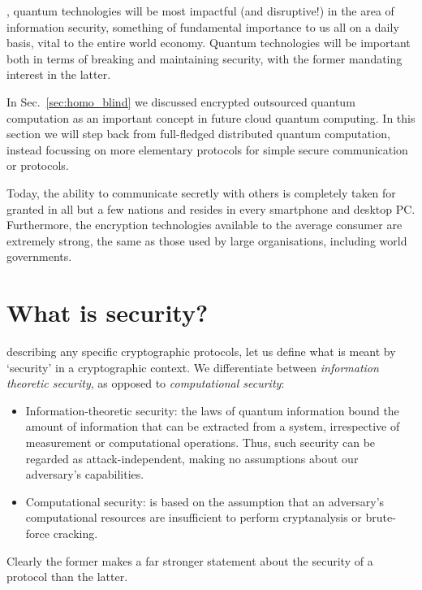 %
%

\newline

, quantum technologies will be most impactful (and disruptive!) in the area of information security, something of fundamental importance to us all on a daily basis, vital to the entire world economy. Quantum technologies will be important both in terms of breaking and maintaining security, with the former mandating interest in the latter.

In Sec.~\ref{sec:homo_blind} we discussed encrypted outsourced quantum computation as an important concept in future cloud quantum computing. In this section we will step back from full-fledged distributed quantum computation, instead focussing on more elementary protocols for simple secure communication or protocols.

Today, the ability to communicate secretly with others is completely taken for granted in all but a few nations and resides in every smartphone and desktop PC. Furthermore, the encryption technologies available to the average consumer are extremely strong, the same as those used by large organisations, including world governments.

%
%

\section{What is security?}\label{sec:comp_vs_inf_th_sec}

 describing any specific cryptographic protocols, let us define what is meant by `security' in a cryptographic context. We differentiate between \textit{information theoretic security}, as opposed to \textit{computational security}:

\begin{itemize}
	\item Information-theoretic security: the laws of quantum information bound the amount of information that can be extracted from a system, irrespective of measurement or computational operations. Thus, such security can be regarded as attack-independent, making no assumptions about our adversary's capabilities.
	\item Computational security: is based on the assumption that an adversary's computational resources are insufficient to perform cryptanalysis or brute-force cracking.
\end{itemize}
Clearly the former makes a far stronger statement about the security of a protocol than the latter.

